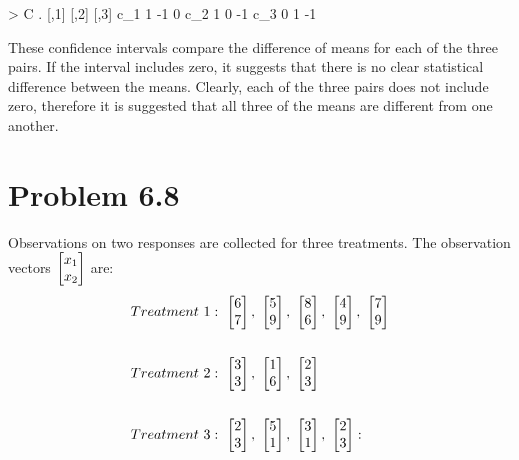 \begin{enumerate}
\begin{rc}
	> C
	.    [,1] [,2] [,3]
	c_1    1   -1    0
	c_2    1    0   -1
	c_3    0    1   -1
\end{rc}
These confidence intervals compare the difference of means for each of the three pairs. If the interval includes zero, it suggests that there is no clear statistical difference between the means. Clearly, each of the three pairs does not include zero, therefore it is suggested that all three of the means are different from one another.

\end{enumerate}


\newpage
\section*{Problem 6.8} 
Observations on two responses are collected for three treatments. The observation vectors $\m{x_1 \\ x_2}$ are: 
	\begin{align*}
		&Treatment\ 1:\ \m{6\\7},\ \m{5\\9},\ \m{8\\6},\ \m{4\\9},\ \m{7\\9} \\
		\\
		&Treatment\ 2:\ \m{3\\3},\ \m{1\\6},\ \m{2\\3} \\
		\\
		&Treatment\ 3:\ \m{2\\3},\ \m{5\\1},\ \m{3\\1},\ \m{2\\3}:
	\end{align*}

